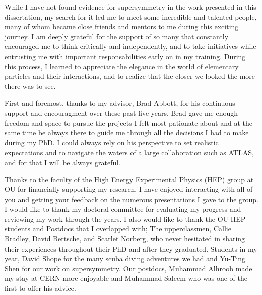 While I have not found evidence for supersymmetry in the work presented in this dissertation, 
my search for it led me to meet some incredible and talented people, many of whom became close
friends and mentors to me during this exciting journey. 
I am deeply grateful for the support of so many that  
constantly encouraged me to think critically and independently, and to take initiatives
while entrusting me with important responsabilities early on in my training.
During this process, I learned to appreciate the elegance in the world of elementary particles 
and their interactions, and to realize that the closer we looked the more there was to see. 

First and foremost, thanks to my advisor, Brad Abbott, for his continuous support and encouragment over these past five years. 
Brad gave me enough freedom and space to pursue the projects I felt most pationate about and at the same time be always
there to guide me through all the decisions I had to make during my PhD. I could always rely on his perspective to set realistic 
expectations and to navigate the waters of a large collaboration such as ATLAS, and for that I will be always grateful.

Thanks to the faculty of the High Energy Experimental Physics (HEP) group at OU%
for financially supporting my research. I have enjoyed interacting with all of you and getting your feedback on the numerous 
presentations I gave to the group. 
I would like to thank my doctoral committee for evaluating my progress and reviewing my work through the years.
I also would like to thank the OU HEP students and Postdocs that I overlapped with;
The upperclassmen, Callie Bradley, David Bertsche, and Scarlet Norberg,  who never hesitated in sharing their experiences throughout their PhD and after they graduated.
Students in my year, David Shope for the many scuba diving adventures we had and Yu-Ting Shen for our work on supersymmetry.
Our postdocs, Muhammad Alhroob  made my stay at CERN more enjoyable and Muhammad Saleem who was one of the first to offer his advice.

